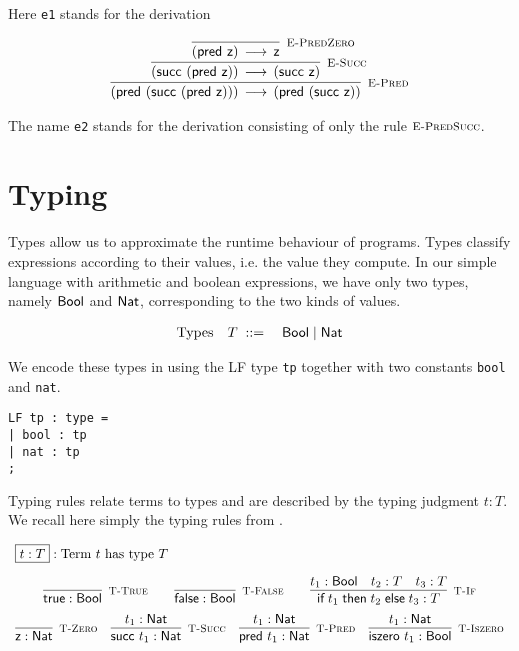 Here \lstinline!e1! stands for the derivation

\[
\begin{array}{c}
\infer[\EPred]{(\tmpred {(\tmsucc {(\tmpred {\tmzero})})}) \Steps (\tmpred {(\tmsucc {\tmzero})})}
{\infer[\ESucc]{(\tmsucc {(\tmpred {\tmzero})}) \Steps (\tmsucc {\tmzero} )}
 {\infer[\EPredZ]{(\tmpred {\tmzero}) \Steps \tmzero}{}}
}
\end{array}
\]

The name \lstinline!e2! stands for the derivation consisting of only
the rule $\textsc{\footnotesize E-PredSucc}$.

\section{Typing}\label{sec:types-basic}
Types allow us to approximate the runtime behaviour of programs. Types
classify expressions according to their values, i.e. the value they
compute. In our simple language with arithmetic and boolean expressions, we have
only two types, namely $\textsf{Bool}$ and $\textsf{Nat}$, corresponding to the two
kinds of values.

\[
\begin{array}{lll}
\mbox{Types} & T \;\mathrel{::=}\; & \textsf{Bool} \mid \textsf{Nat}
\end{array}
\]

We encode these types in \beluga using the LF type \lstinline!tp! together with
two constants \lstinline!bool! and \lstinline!nat!.

\begin{lstlisting}
LF tp : type =
| bool : tp
| nat : tp
;
\end{lstlisting}

Typing rules relate terms to types and are described by the typing
judgment $t : T$. We recall here simply the typing rules from \cite{TAPL}.

\[
\begin{array}{c}
\multicolumn{1}{l}{\fbox{$t \hastype T$}: \mbox{Term $t$ has type $T$}}\\[1em]
  \infer[\TTrue]{\tmtrue \hastype \Bool}{} \qquad
  \infer[\TFalse]{\tmfalse \hastype \Bool}{} \qquad
  \infer[\TIf]{\tmif{t_1}{t_2}{t_3} \hastype T}{t_1 \hastype \Bool & t_2 \hastype T & t_3 \hastype T}
\\[0.5em]
  \infer[\TZero]{\tmzero \hastype \Nat}{}\quad
  \infer[\TSucc]{\tmsucc t_1 \hastype \Nat}{t_1 \hastype \Nat} \quad
  \infer[\TPred]{\tmpred t_1 \hastype \Nat}{t_1 \hastype \Nat} \quad
  \infer[\TIsZero]{\tmiszero t_1 \hastype \Bool}{t_1 \hastype \Nat}
\\
\end{array}
\]



